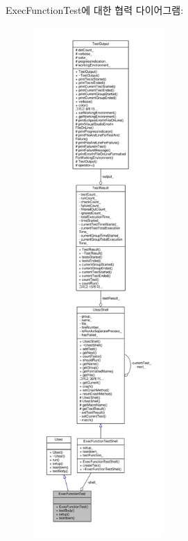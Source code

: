 Exec\+Function\+Test에 대한 협력 다이어그램\+:
\nopagebreak
\begin{figure}[H]
\begin{center}
\leavevmode
\includegraphics[height=550pt]{class_exec_function_test__coll__graph}
\end{center}
\end{figure}
